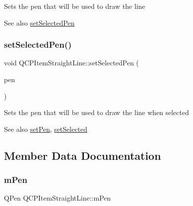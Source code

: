 Sets the pen that will be used to draw the line

\begin{DoxySeeAlso}{See also}
\hyperlink{class_q_c_p_item_straight_line_a5c33559498d33543fa95cf0a36e851ff}{set\+Selected\+Pen} 
\end{DoxySeeAlso}
\mbox{\label{class_q_c_p_item_straight_line_a5c33559498d33543fa95cf0a36e851ff}} 
\subsubsection{\texorpdfstring{set\+Selected\+Pen()}{setSelectedPen()}}
{\footnotesize\ttfamily void Q\+C\+P\+Item\+Straight\+Line\+::set\+Selected\+Pen (\begin{DoxyParamCaption}\item[{const Q\+Pen \&}]{pen }\end{DoxyParamCaption})}

Sets the pen that will be used to draw the line when selected

\begin{DoxySeeAlso}{See also}
\hyperlink{class_q_c_p_item_straight_line_a9f36c9c9e60d7d9ac084c80380ac8601}{set\+Pen}, \hyperlink{class_q_c_p_abstract_item_a203de94ad586cc44d16c9565f49d3378}{set\+Selected} 
\end{DoxySeeAlso}


\subsection{Member Data Documentation}
\mbox{\label{class_q_c_p_item_straight_line_a15106ddc2ebd73ed5c1bc57aa92bee8f}} 
\subsubsection{\texorpdfstring{m\+Pen}{mPen}}
{\footnotesize\ttfamily Q\+Pen Q\+C\+P\+Item\+Straight\+Line\+::m\+Pen\hspace{0.3cm}{\ttfamily [protected]}}


